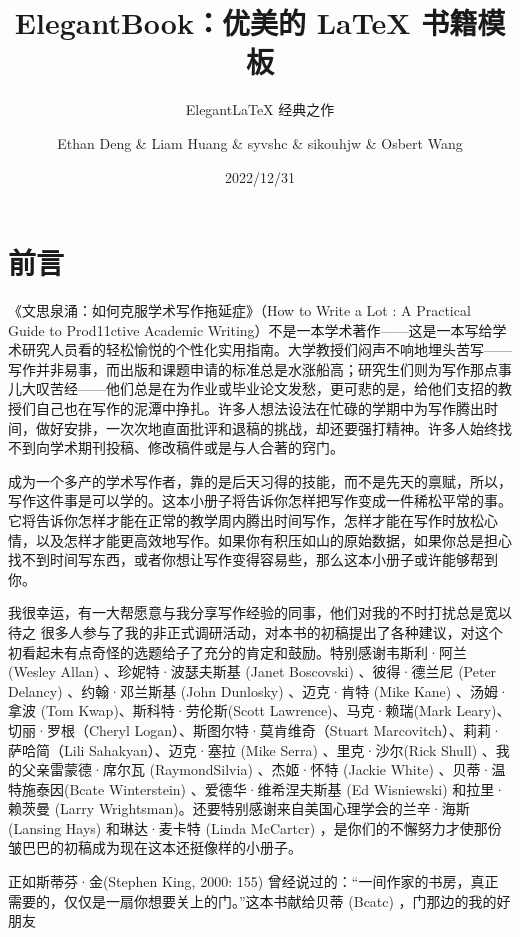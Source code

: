 \documentclass[lang=cn,newtx,14pt,scheme=chinese]{elegantbook}
\title{ElegantBook：优美的 \LaTeX{} 书籍模板}
\subtitle{Elegant\LaTeX{} 经典之作}
\author{Ethan Deng \& Liam Huang \& syvshc \& sikouhjw \& Osbert Wang}
\institute{Elegant\LaTeX{} Program}
\date{2022/12/31}
\begin{document}
\maketitle
\frontmatter


\chapter*{前言}
《文思泉涌：如何克服学术写作拖延症》（How to Write a Lot : A Practical Guide to Prod11ctive Academic Writing）不是一本学术著作——这是一本写给学术研究人员看的轻松愉悦的个性化实用指南。大学教授们闷声不响地埋头苦写——写作并非易事，而出版和课题申请的标准总是水涨船高；研究生们则为写作那点事儿大叹苦经——他们总是在为作业或毕业论文发愁，更可悲的是，给他们支招的教授们自己也在写作的泥潭中挣扎。许多人想法设法在忙碌的学期中为写作腾出时间，做好安排，一次次地直面批评和退稿的挑战，却还要强打精神。许多人始终找不到向学术期刊投稿、修改稿件或是与人合著的窍门。

成为一个多产的学术写作者，靠的是后天习得的技能，而不是先天的禀赋，所以，写作这件事是可以学的。这本小册子将告诉你怎样把写作变成一件稀松平常的事。它将告诉你怎样才能在正常的教学周内腾出时间写作，怎样才能在写作时放松心情，以及怎样才能更高效地写作。如果你有积压如山的原始数据，如果你总是担心找不到时间写东西，或者你想让写作变得容易些，那么这本小册子或许能够帮到你。

我很幸运，有一大帮愿意与我分享写作经验的同事，他们对我的不时打扰总是宽以待之 很多人参与了我的非正式调研活动，对本书的初稿提出了各种建议，对这个初看起未有点奇怪的选题给子了充分的肯定和鼓励。特别感谢韦斯利·阿兰 (Wesley Allan) 、珍妮特·波瑟夫斯基 (Janet Boscovski) 、彼得·德兰尼 (Peter Delancy) 、约翰·邓兰斯基 (John Dunlosky) 、迈克·肯特 (Mike Kane) 、汤姆·拿波 (Tom Kwap)、斯科特·劳伦斯(Scott Lawrence)、马克·赖瑞(Mark Leary)、切丽·罗根（Cheryl Logan）、斯图尔特·莫肯维奇（Stuart Marcovitch）、莉莉·萨哈简（Lili Sahakyan）、迈克·塞拉 (Mike Serra) 、里克·沙尔(Rick Shull) 、我的父亲雷蒙德·席尔瓦 (RaymondSilvia) 、杰姬·怀特 (Jackie White) 、贝蒂·温特施泰因(Bcate Winterstein) 、爱德华·维希涅夫斯基 (Ed Wisniewski) 和拉里·赖茨曼 (Larry Wrightsman)。还要特别感谢来自美国心理学会的兰辛·海斯 (Lansing Hays) 和琳达·麦卡特 (Linda McCartcr) ，是你们的不懈努力才使那份皱巴巴的初稿成为现在这本还挺像样的小册子。

正如斯蒂芬·金(Stephen King, 2000: 155) 曾经说过的：“一间作家的书房，真正需要的，仅仅是一扇你想要关上的门。”这本书献给贝蒂 (Bcatc) ，门那边的我的好朋友

\tableofcontents
\mainmatter










\end{document}
